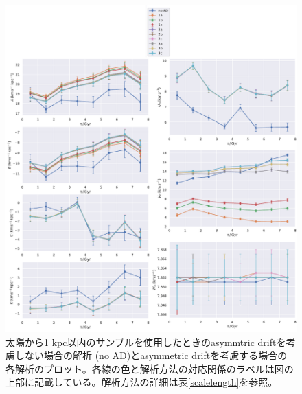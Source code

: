 \begin{figure}[htbp]
\begin{center}
	\includegraphics[width=15cm]{fig/multi.pdf}
	\caption{太陽から1 kpc以内のサンプルを使用したときのasymmtric driftを考慮しない場合の解析 (no AD)とasymmetric driftを考慮する場合の各解析のプロット。各線の色と解析方法の対応関係のラベルは図の上部に記載している。解析方法の詳細は表\ref{scalelength}を参照。}
	\label{multi}
\end{center}
\end{figure}